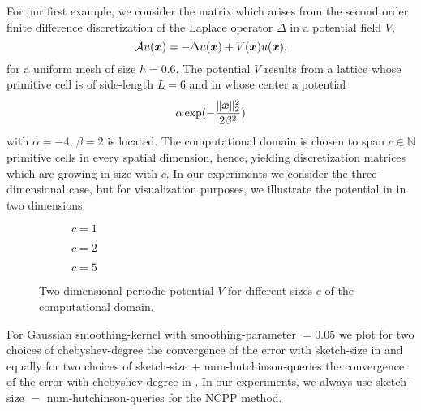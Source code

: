 For our first example, we consider the matrix which arises from the second order
finite difference discretization of the Laplace operator $\Delta$ in a potential
field $V$,
\begin{equation}
    \mathcal{A} u(\boldsymbol{x}) = - \Delta u(\boldsymbol{x}) + V(\boldsymbol{x}) u(\boldsymbol{x}),
    \label{equ:5-experiments-electronic-hamiltonian}
\end{equation}
for a uniform mesh of size $h=0.6$. The potential $V$ results from a
lattice whose primitive cell is of side-length $L=6$ and in whose center a
potential
\begin{equation}
    \alpha \exp(-\frac{\lVert \boldsymbol{x} \rVert _2^2}{ 2 \beta^2 })
    \label{equ:5-experiments-gaussian-cell}
\end{equation}
with $\alpha = -4$, $\beta = 2$ is located. The computational domain is chosen
to span $c \in \mathbb{N}$ primitive cells in every spatial dimension, hence, yielding
discretization matrices which are growing in size with $c$. In our experiments
we consider the three-dimensional case, but for visualization purposes, we
illustrate the potential in 
in two dimensions.\\

\begin{figure}[ht]
    \begin{subfigure}[b]{0.32\columnwidth}
        
        \caption{$c=1$}
        \label{fig:5-experiments-periodic-gaussian-well-1}
    \end{subfigure}
    \begin{subfigure}[b]{0.32\columnwidth}
        
        \caption{$c=2$}
        \label{fig:5-experiments-periodic-gaussian-well-2}
    \end{subfigure}
    \begin{subfigure}[b]{0.32\columnwidth}
        
        \caption{$c=5$}
        \label{fig:5-experiments-periodic-gaussian-well-5}
    \end{subfigure}
    \caption{Two dimensional periodic potential $V$ for different sizes $c$ of the computational domain.}
    \label{fig:5-experiments-periodic-gaussian-well}
\end{figure}

For Gaussian \gls{smoothing-kernel} 
with \gls{smoothing-parameter} $=0.05$ we plot for two choices of \gls{chebyshev-degree}
the convergence of the error with \gls{sketch-size} in 
and equally for two choices of \gls{sketch-size} $+$ \gls{num-hutchinson-queries} the convergence of the
error with \gls{chebyshev-degree} in .
In our experiments, we always use \gls{sketch-size} $=$ \gls{num-hutchinson-queries} for
the \gls{NCPP} method.\\

